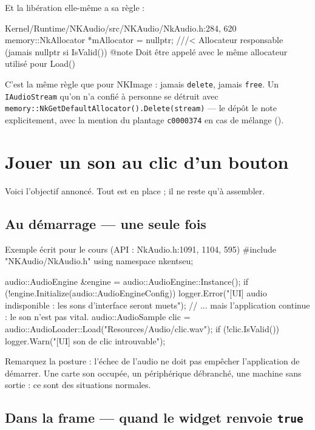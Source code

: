 Et la libération elle-même a sa règle :

\begin{nkcode}{Kernel/Runtime/NKAudio/src/NKAudio/NkAudio.h:284, 620}
memory::NkAllocator *mAllocator = nullptr; ///< Allocateur responsable (jamais nullptr si IsValid())
 @note Doit être appelé avec le même allocateur utilisé pour Load()
\end{nkcode}

C'est la même règle que pour NKImage : jamais \texttt{delete}, jamais
\texttt{free}. Un \texttt{IAudioStream} qu'on n'a confié à personne se détruit
avec \texttt{memory::NkGetDefaultAllocator().Delete(stream)} — le dépôt le note
explicitement, avec la mention du plantage \texttt{c0000374} en cas de mélange
().

\section{Jouer un son au clic d'un bouton}

Voici l'objectif annoncé. Tout est en place ; il ne reste qu'à assembler.

\subsection{Au démarrage — une seule fois}

\begin{nkcode}{Exemple écrit pour le cours (API : NkAudio.h:1091, 1104, 595)}
#include "NKAudio/NkAudio.h"
using namespace nkentseu;

audio::AudioEngine &engine = audio::AudioEngine::Instance();
if (!engine.Initialize(audio::AudioEngineConfig{})) {
    logger.Error("[UI] audio indisponible : les sons d'interface seront muets");
    // ... mais l'application continue : le son n'est pas vital.
}
audio::AudioSample clic = audio::AudioLoader::Load("Resources/Audio/clic.wav");
if (!clic.IsValid())
    logger.Warn("[UI] son de clic introuvable");
\end{nkcode}

Remarquez la posture : l'échec de l'audio ne doit pas empêcher l'application de
démarrer. Une carte son occupée, un périphérique débranché, une machine sans
sortie : ce sont des situations normales.

\subsection{Dans la frame — quand le widget renvoie \texttt{true}}

